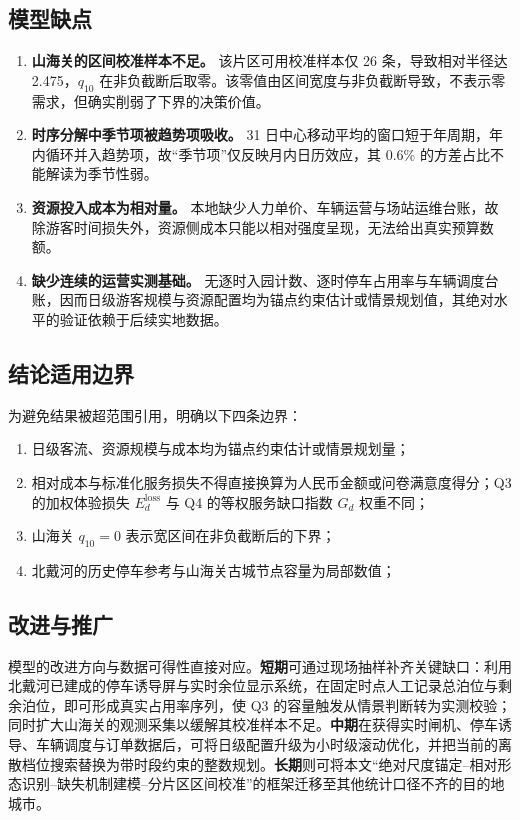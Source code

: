 \documentclass[withoutpreface,bwprint]{cumcmthesis}
\begin{document}
\subsection{模型缺点}
\begin{enumerate}[label=\textbf{（\arabic*）},leftmargin=2.6em,itemsep=3pt]
\item\textbf{山海关的区间校准样本不足。} 该片区可用校准样本仅 26 条，导致相对半径达 2.475，$q_{10}$ 在非负截断后取零。该零值由区间宽度与非负截断导致，不表示零需求，但确实削弱了下界的决策价值。
\item\textbf{时序分解中季节项被趋势项吸收。} 31 日中心移动平均的窗口短于年周期，年内循环并入趋势项，故“季节项”仅反映月内日历效应，其 0.6\% 的方差占比不能解读为季节性弱。
\item\textbf{资源投入成本为相对量。} 本地缺少人力单价、车辆运营与场站运维台账，故除游客时间损失外，资源侧成本只能以相对强度呈现，无法给出真实预算数额。
\item\textbf{缺少连续的运营实测基础。} 无逐时入园计数、逐时停车占用率与车辆调度台账，因而日级游客规模与资源配置均为锚点约束估计或情景规划值，其绝对水平的验证依赖于后续实地数据。
\end{enumerate}

\subsection{结论适用边界}
为避免结果被超范围引用，明确以下四条边界：

\begin{enumerate}[label=\textbf{B\arabic*.},leftmargin=3.0em,itemsep=2pt]
\item 日级客流、资源规模与成本均为锚点约束估计或情景规划量；
\item 相对成本与标准化服务损失不得直接换算为人民币金额或问卷满意度得分；Q3 的加权体验损失 $E_d^{\mathrm{loss}}$ 与 Q4 的等权服务缺口指数 $G_d$ 权重不同；
\item 山海关 $q_{10}=0$ 表示宽区间在非负截断后的下界；
\item 北戴河的历史停车参考与山海关古城节点容量为局部数值；
\end{enumerate}

\subsection{改进与推广}
模型的改进方向与数据可得性直接对应。\textbf{短期}可通过现场抽样补齐关键缺口：利用北戴河已建成的停车诱导屏与实时余位显示系统，在固定时点人工记录总泊位与剩余泊位，即可形成真实占用率序列，使 Q3 的容量触发从情景判断转为实测校验；同时扩大山海关的观测采集以缓解其校准样本不足。\textbf{中期}在获得实时闸机、停车诱导、车辆调度与订单数据后，可将日级配置升级为小时级滚动优化，并把当前的离散档位搜索替换为带时段约束的整数规划。\textbf{长期}则可将本文“绝对尺度锚定--相对形态识别--缺失机制建模--分片区区间校准”的框架迁移至其他统计口径不齐的目的地城市。
\end{document}
